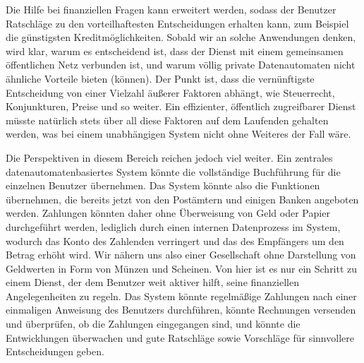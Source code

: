 {Die Hilfe bei finanziellen Fragen kann erweitert werden, sodass der Benutzer Ratschläge zu den vorteilhaftesten Entscheidungen erhalten kann, zum Beispiel die günstigsten Kreditmöglichkeiten. Sobald wir an solche Anwendungen denken, wird klar, warum es entscheidend ist, dass der Dienst mit einem gemeinsamen öffentlichen Netz verbunden ist, und warum völlig private Datenautomaten nicht ähnliche Vorteile bieten (können). Der Punkt ist, dass die vernünftigste Entscheidung von einer Vielzahl äußerer Faktoren abhängt, wie Steuerrecht, Konjunkturen, Preise und so weiter. Ein effizienter, öffentlich zugreifbarer Dienst müsste natürlich stets über all diese Faktoren auf dem Laufenden gehalten werden, was bei einem unabhängigen System nicht ohne Weiteres der Fall wäre.

Die Perspektiven in diesem Bereich reichen jedoch viel weiter. Ein zentrales datenautomatenbasiertes System könnte die vollständige Buchführung für die einzelnen Benutzer übernehmen. Das System könnte also die Funktionen übernehmen, die bereits jetzt von den Postämtern und einigen Banken angeboten werden. Zahlungen könnten daher ohne Überweisung von Geld oder Papier durchgeführt werden, lediglich durch einen internen Datenprozess im System, wodurch das Konto des Zahlenden verringert und das des Empfängers um den Betrag erhöht wird. Wir nähern uns also einer Gesellschaft ohne Darstellung von Geldwerten in Form von Münzen und Scheinen. Von hier ist es nur ein Schritt zu einem Dienst, der dem Benutzer weit aktiver hilft, seine finanziellen Angelegenheiten zu regeln. Das System könnte regelmäßige Zahlungen nach einer einmaligen Anweisung des Benutzers durchführen, könnte Rechnungen versenden und überprüfen, ob die Zahlungen eingegangen sind, und könnte die Entwicklungen überwachen und gute Ratschläge sowie Vorschläge für sinnvollere Entscheidungen geben.



}


